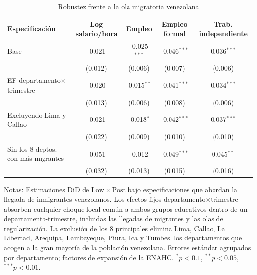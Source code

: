 \begin{table}[!tbp]\centering
\caption{Robustez frente a la ola migratoria venezolana}\label{tab:migration}
\begin{threeparttable}
\footnotesize
\setlength{\tabcolsep}{4pt}
\begin{tabular}{lcccc}
\toprule
Especificación & Log salario/hora & Empleo & Empleo formal & Trab. independiente \\
\midrule
Base & -0.021 & -0.025$^{***}$ & -0.046$^{***}$ & 0.036$^{***}$ \\
 & (0.012) & (0.006) & (0.007) & (0.006) \\
EF departamento$\times$trimestre & -0.020 & -0.015$^{**}$ & -0.041$^{***}$ & 0.034$^{***}$ \\
 & (0.013) & (0.006) & (0.008) & (0.006) \\
Excluyendo Lima y Callao & -0.021 & -0.018$^{*}$ & -0.042$^{***}$ & 0.037$^{***}$ \\
 & (0.022) & (0.009) & (0.010) & (0.010) \\
Sin los 8 deptos. con más migrantes & -0.051 & -0.012 & -0.049$^{***}$ & 0.045$^{**}$ \\
 & (0.032) & (0.013) & (0.015) & (0.016) \\
\bottomrule
\end{tabular}
\begin{tablenotes}\footnotesize
\item Notas: Estimaciones DiD de $\mathrm{Low}\times\mathrm{Post}$ bajo especificaciones que abordan la llegada de inmigrantes venezolanos. Los efectos fijos departamento$\times$trimestre absorben cualquier choque local común a ambos grupos educativos dentro de un departamento-trimestre, incluidas las llegadas de migrantes y las olas de regularización. La exclusión de los 8 principales elimina Lima, Callao, La Libertad, Arequipa, Lambayeque, Piura, Ica y Tumbes, los departamentos que acogen a la gran mayoría de la población venezolana. Errores estándar agrupados por departamento; factores de expansión de la ENAHO. $^{*}p<0.1$, $^{**}p<0.05$, $^{***}p<0.01$.
\end{tablenotes}
\end{threeparttable}\end{table}
